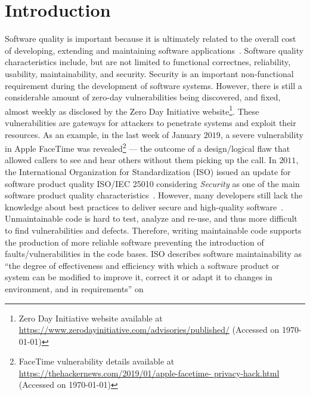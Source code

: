\documentclass[sigconf,review]{acmart}
\begin{document}

\maketitle


\section{Introduction}
%
Software quality is important because it is ultimately related to the overall
cost of developing, extending and maintaining software applications~\cite{slaughter1998evaluating}. 
Software quality characteristics include, but are not limited to functional correctnes,
reliability, usability, maintainability, and security. Security is an 
important non-functional requirement during the development of software systems. 
However, there is still a considerable amount of zero-day vulnerabilities being
discovered, and fixed, almost weekly as disclosed by the Zero Day Initiative
website\footnote{Zero Day Initiative website available at
\url{https://www.zerodayinitiative.com/advisories/published/} (Accessed on \today{})}.
These vulnerabilities are gateways for attackers to penetrate systems and 
exploit their resources. As an example, in the last week of January $2019$, 
a severe vulnerability in Apple FaceTime was revealed\footnote{FaceTime vulnerability 
details available at \url{https://thehackernews.com/2019/01/apple-facetime-
privacy-hack.html} (Accessed on \today{})} --- the outcome of a design/logical
flaw that allowed callers to see and hear others without them picking up the call.
%
In $2011$, the International Organization for Standardization (ISO) issued an
update for software product quality ISO/IEC 25010 considering
\emph{Security} as one of the main software product quality characteristics~\cite{iso:2011}. 
However, many developers still lack the knowledge about best practices to deliver secure and high-quality software~\cite{Pothamsetty:2005:SEL:1107622.1107635, 8077802}.
Unmaintainable code is hard to test, analyze and re-use, and thus more difficult
to find vulnerabilities and defects. Therefore, writing maintainable code
supports the production of more reliable software preventing the introduction of 
faults/vulnerabilities in the code bases. ISO describes software 
maintainability as ``the degree of effectiveness and
efficiency with which a software product or system can be modified to improve
it, correct it or adapt it to changes in environment, and in requirements'' on
\end{document}
